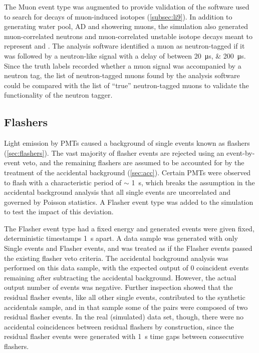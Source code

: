 The Muon event type was augmented to provide validation
of the software used to search for decays of muon-induced isotopes
(\cref{subsec:li9}).
In addition to generating water pool, AD and showering muons,
the simulation also generated muon-correlated neutrons
and muon-correlated unstable isotope decays
meant to represent \li{} and \he.
The analysis software identified a muon as neutron-tagged
if it was followed by a neutron-like signal
with a delay of between \SIlist{20;200}{\us}.
Since the truth labels recorded whether a muon signal
was accompanied by a neutron tag,
the list of neutron-tagged muons found by the analysis software
could be compared with the list of ``true'' neutron-tagged muons
to validate the functionality of the neutron tagger.

\subsection{Flashers}
\label{subsec:toymc_flashers}

Light emission by PMTs caused a background of single events
known as flashers (\cref{sec:flashers}).
The vast majority of flasher events are rejected using an event-by-event veto,
and the remaining flashers are assumed to be accounted for
by the treatment of the accidental background (\cref{sec:acc}).
Certain PMTs were observed to flash with a characteristic period of $\sim$ \SI{1}{\s},
which breaks the assumption in the accidental background analysis
that all single events are uncorrelated and governed by Poisson statistics.
A Flasher event type was added to the simulation to test the impact of this deviation.

The Flasher event type had a fixed energy
and generated events were given fixed, deterministic timestamps \SI{1}{\s} apart.
A data sample was generated with only Single events and Flasher events,
and was treated as if the Flasher events passed the existing flasher veto criteria.
The accidental background analysis was performed on this data sample,
with the expected output of \num{0} coincident events remaining
after subtracting the accidental background.
However, the actual output number of events was negative.
Further inspection showed that the residual flasher events,
like all other single events,
contributed to the synthetic accidentals sample,
and in that sample some of the pairs
were composed of two residual flasher events.
In the real (simulated) data set, though,
there were no accidental coincidences between residual flashers by construction,
since the residual flasher events were generated with \SI{1}{\s} time gaps
between consecutive flashers.

